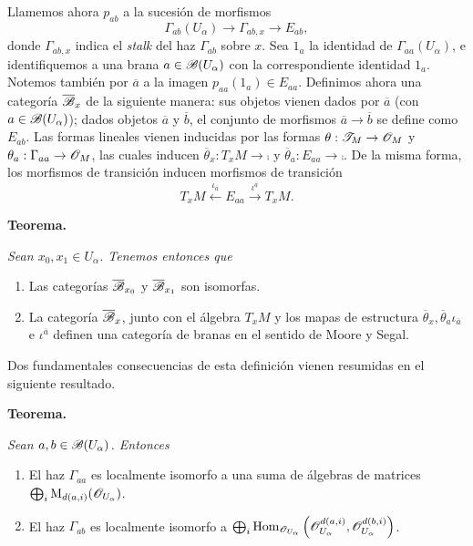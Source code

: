 {Llamemos ahora $p_{ab}$ a la sucesi\'on de morfismos
$$\Gamma_{ab}(U_\alpha)\longrightarrow \Gamma_{ab,x}\longrightarrow E_{ab},$$
donde $\Gamma_{ab,x}$ indica el \emph{stalk} del haz $\Gamma_{ab}$ sobre $x$. Sea $1_a$ la identidad de $\Gamma_{aa}(U_\alpha )$, e identifiquemos a una brana $a\in \mathscr{B}(U_\alpha )$ con la correspondiente identidad $1_a$. Notemos tambi\'en por $\overline{a}$ a la imagen $p_{aa}(1_a)\in E_{aa}$. Definimos ahora una categor\'ia $\overline{\mathscr{B}}_x$ de la siguiente manera: sus objetos vienen dados por $\overline{a}$ (con $a\in \mathscr{B}(U_\alpha)$); dados objetos $\overline{a}$ y $\overline{b}$, el conjunto de morfismos $\overline{a}\to \overline{b}$ se define como $E_{ab}$. Las formas lineales vienen inducidas por las formas $\theta :\mathscr{T}_M\to \mathscr{O}_M$ y $\theta_a :\Gamma_{aa}\to \mathscr{O}_M$, las cuales inducen $\overline{\theta}_x:T_xM\to \comp$ y $\overline{\theta}_a:E_{aa}\to \comp$. De la misma forma, los morfismos de transici\'on inducen morfismos de transici\'on
$$T_xM\stackrel{\iota_{\overline{a}}}{\longleftarrow}E_{aa}\stackrel{\iota^{\overline{a}}}{\longrightarrow}T_xM.$$
\medskip

{\bf Teorema.} {\it Sean $x_0,x_1\in U_\alpha$. Tenemos entonces que
\begin{enumerate}
\item Las categor\'ias $\overline{\mathscr{B}}_{x_0}$ y $\overline{\mathscr{B}}_{x_1}$ son isomorfas.
\item La categor\'ia $\overline{\mathscr{B}}_x$, junto con el \'algebra $T_xM$ y los mapas de estructura $\overline{\theta}_x, \overline{\theta}_a \iota_{\overline{a}}$ e $\iota^{\overline{a}}$ definen una categor\'ia de branas en el sentido de Moore y Segal.
\end{enumerate}}
\medskip

Dos fundamentales consecuencias de esta definici\'on vienen resumidas en el siguiente resultado.
\medskip

{\bf Teorema.} {\it Sean $a,b\in \mathscr{B}(U_\alpha)$. Entonces
\begin{enumerate}
\item El haz $\Gamma_{aa}$ es localmente isomorfo a una suma de \'algebras de matrices $\bigoplus_i\operatorname{M}_{d(a,i)}(\mathscr{O}_{U_{\alpha}})$.
\item El haz $\Gamma_{ab}$ es localmente isomorfo a $\bigoplus_i\operatorname{Hom}_{\mathscr{O}_{U_\alpha}}\left (\mathscr{O}_{U_\alpha}^{d(a,i)},\mathscr{O}_{U_\alpha}^{d(b,i)}\right )$.
\end{enumerate}}


}
